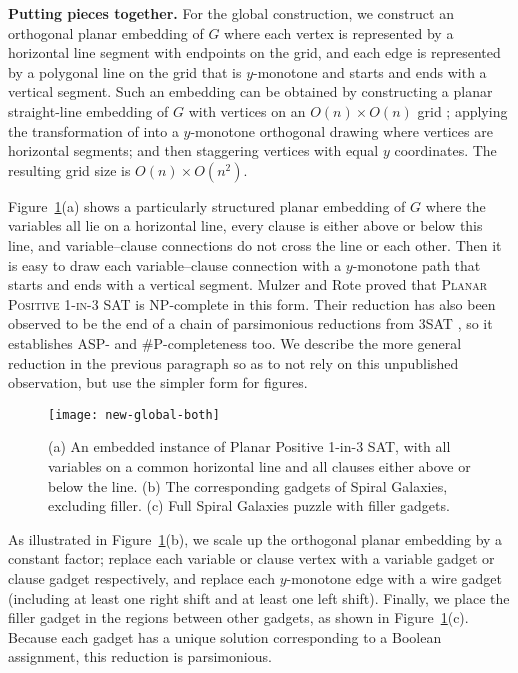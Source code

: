 \textbf{Putting pieces together.}
For the global construction, we construct an orthogonal planar embedding of $G$
where each vertex is represented by a horizontal line segment
with endpoints on the grid,
and each edge is represented by a polygonal line on the grid
that is $y$-monotone and starts and ends with a vertical segment.
Such an embedding can be obtained by
constructing a planar straight-line embedding of $G$
with vertices on an $O(n) \times O(n)$ grid \cite{schnyder90};
applying the transformation of \cite[Theorem~5]{biedl14}
into a $y$-monotone orthogonal drawing where vertices are horizontal segments;
and then staggering vertices with equal $y$ coordinates.
The resulting grid size is $O(n) \times O(n^2)$.

Figure~\ref{fig:global}(a) shows a particularly structured planar embedding
of $G$
where the variables all lie on a horizontal line,
every clause is either above or below this line,
and variable--clause connections do not cross the line or each other.
Then it is easy to draw each variable--clause connection with a $y$-monotone
path that starts and ends with a vertical segment.
Mulzer and Rote \cite{mulzer08} proved that \textsc{Planar Positive 1-in-3 SAT}
is NP-complete in this form.  Their reduction has also been observed to be
the end of a chain of parsimonious reductions from 3SAT
\cite{6.890-planar-1-in-3},
so it establishes ASP- and \#P-completeness too.
We describe the more general reduction in the previous paragraph
so as to not rely on this unpublished observation,
but use the simpler form for figures.

\begin {figure}
  \centering
  \texttt{[image: new-global-both]}
  \caption 
  { (a) An embedded instance of Planar Positive 1-in-3 SAT, with all variables on a common horizontal line and all clauses either above or below the line.
    (b) The corresponding gadgets of Spiral Galaxies, excluding filler.
    (c) Full Spiral Galaxies puzzle with filler gadgets.
  }
  \label{fig:global}
\end {figure}

As illustrated in Figure~\ref{fig:global}(b),
we scale up the orthogonal planar embedding by a constant factor;
replace each variable or clause vertex with a variable gadget or clause gadget
respectively,
and replace each $y$-monotone edge with a wire gadget
(including at least one right shift and at least one left shift).
Finally, we place the filler gadget in the regions between other gadgets,
as shown in Figure~\ref{fig:global}(c).
Because each gadget has a unique solution corresponding to a Boolean
assignment, this reduction is parsimonious.

